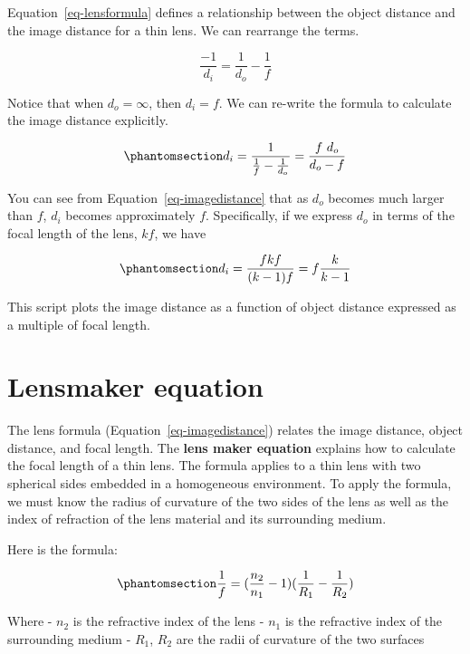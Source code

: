 \documentclass[
  letterpaper,
]{book}
\begin{document}
Equation~\ref{eq-lensformula} defines a relationship between the object
distance and the image distance for a thin lens. We can rearrange the
terms.

\[
\frac{-1}{d_i} = \frac{1}{d_o} - \frac{1}{f}
\]

Notice that when \(d_o = \infty\), then \(d_i = f\). We can re-write the
formula to calculate the image distance explicitly.

\begin{equation}\phantomsection\label{eq-imagedistance}{
d_i = \frac{1}{\frac{1}{f} - \frac{1}{d_o}} = \frac{f~d_o}{d_o - f} 
}\end{equation}

You can see from Equation~\ref{eq-imagedistance} that as \(d_o\) becomes
much larger than \(f\), \(d_i\) becomes approximately \(f\).
Specifically, if we express \(d_o\) in terms of the focal length of the
lens, \(k f\), we have

\begin{equation}\phantomsection\label{eq-imagedistance}{
d_i = \frac{f k f}{(k-1) f} = f \frac{k}{k-1}
}\end{equation}

This script plots the image distance as a function of object distance
expressed as a multiple of focal length.

\section{Lensmaker equation}\label{sec-optics-lensmaker}

The lens formula (Equation~\ref{eq-imagedistance}) relates the image
distance, object distance, and focal length. The \textbf{lens maker
equation} explains how to calculate the focal length of a thin lens. The
formula applies to a thin lens with two spherical sides embedded in a
homogeneous environment. To apply the formula, we must know the radius
of curvature of the two sides of the lens as well as the index of
refraction of the lens material and its surrounding medium.

Here is the formula:

\begin{equation}\phantomsection\label{eq-lensmaker}{
\frac{1}{f} = (\frac{n_2}{n_1} - 1) ( \frac{1}{R_1} - \frac{1}{R_2}) 
}\end{equation}

Where - \(n_2\) is the refractive index of the lens - \(n_1\) is the
refractive index of the surrounding medium - \(R_1\), \(R_2\) are the
radii of curvature of the two surfaces
\end{document}

